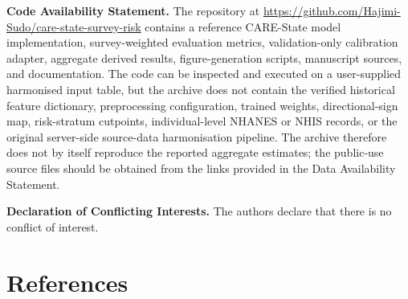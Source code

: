 \documentclass[12pt]{article}
\newcommand{\codeavailability}[1]{\par\medskip\noindent\textbf{Code Availability Statement.} #1\par}
\newcommand{\conflictsofinterest}[1]{\par\medskip\noindent\textbf{Declaration of Conflicting Interests.} #1\par}
\begin{document}
\codeavailability{The repository at \url{https://github.com/Hajimi-Sudo/care-state-survey-risk} contains a reference CARE-State model implementation, survey-weighted evaluation metrics, validation-only calibration adapter, aggregate derived results, figure-generation scripts, manuscript sources, and documentation. The code can be inspected and executed on a user-supplied harmonised input table, but the archive does not contain the verified historical feature dictionary, preprocessing configuration, trained weights, directional-sign map, risk-stratum cutpoints, individual-level NHANES or NHIS records, or the original server-side source-data harmonisation pipeline. The archive therefore does not by itself reproduce the reported aggregate estimates; the public-use source files should be obtained from the links provided in the Data Availability Statement.}
\conflictsofinterest{The authors declare that there is no conflict of interest.}

\section*{References}


\end{document}
